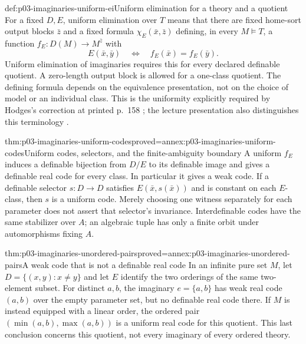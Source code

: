 \begin{hbdefinition}{def:p03-imaginaries-uniform-ei}{Uniform elimination for a theory and a quotient}
For a fixed \(D,E\), uniform elimination over \(T\) means that there
are fixed home-sort output blocks \(\bar z\) and a fixed formula
\(\chi_E(\bar x,\bar z)\) defining, in every \(M\models T\), a
function \(f_E:D(M)\to M^{\bar z}\) with
\[
       E(\bar x,\bar y)\quad\Longleftrightarrow\quad
                         f_E(\bar x)=f_E(\bar y).
\]
Uniform elimination of imaginaries requires this for every declared definable
quotient. A zero-length output block is allowed for a one-class quotient.
The defining formula depends on the equivalence presentation, not on the
choice of model or an individual class. This is the uniformity explicitly
required by Hodges's correction at printed p.~158
\cite[p.~2]{Hodges1993Corrigenda2011}; the lecture presentation also distinguishes
this terminology \cite[pp.~1--2]{Speirs2013Imaginaries}.
\end{hbdefinition}

\begin{hbtheorem}{thm:p03-imaginaries-uniform-codes}{proved=annex:p03-imaginaries-uniform-codes}{Uniform codes, selectors, and the finite-ambiguity boundary}
A uniform \(f_E\) induces a definable bijection from \(D/E\) to its
definable image and gives a definable real code for every class. In particular
it gives a weak code. If a definable selector \(s:D\to D\) satisfies
\(E(\bar x,s(\bar x))\) and is constant on each \(E\)-class, then
\(s\) is a uniform code. Merely choosing one witness separately for each
parameter does not assert that selector's invariance.
Interdefinable codes have the same stabilizer over \(A\); an algebraic
tuple has only a finite orbit under automorphisms fixing \(A\).
\end{hbtheorem}

\begin{hbtheorem}{thm:p03-imaginaries-unordered-pairs}{proved=annex:p03-imaginaries-unordered-pairs}{A weak code that is not a definable real code}
In an infinite pure set \(M\), let \(D=\{(x,y):x\ne y\}\) and let
\(E\) identify the two orderings of the same two-element subset. For
distinct \(a,b\), the imaginary \(e=\{a,b\}\) has weak real code
\((a,b)\) over the empty parameter set, but no definable real code there.
If \(M\) is instead equipped with a linear order, the ordered pair
\((\min(a,b),\max(a,b))\) is a uniform real code for this quotient.
This last conclusion concerns this quotient, not every imaginary of every
ordered theory.
\end{hbtheorem}

